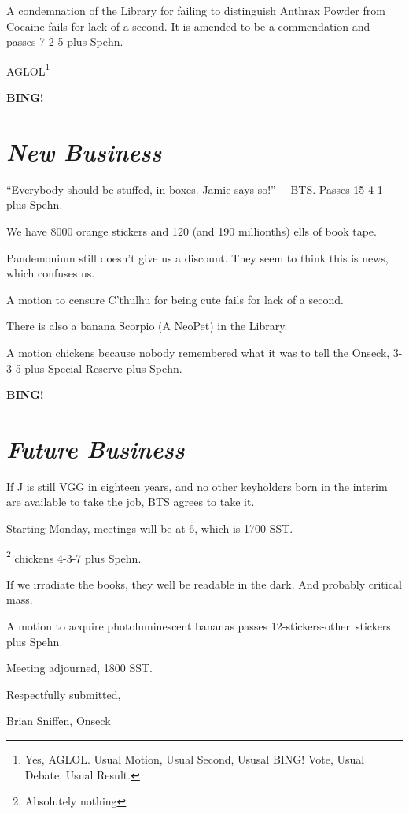 \documentclass[10pt]{article}
\newcommand{\bing}{{\bf BING!} }
\newcommand{\goto}[1]{\bing \vskip 12pt \section*{{\em{#1}}}}
\newcommand{\ps}{ plus Spehn\xspace}
\begin{document}
A condemnation of the Library for failing to distinguish Anthrax
Powder from Cocaine fails for lack of a second.  It is amended to be a
commendation and passes 7-2-5\ps.

AGLOL\footnote{Yes, AGLOL.  Usual Motion, Usual Second, Ususal BING! Vote,
  Usual Debate, Usual Result.}

\goto{New Business}

``Everybody should be stuffed, in boxes.  Jamie says so!'' ---BTS.
Passes 15-4-1\ps.

We have 8000 orange stickers and 120 (and 190 millionths) ells of book tape.

Pandemonium still doesn't give us a discount.  They seem to think this
is news, which confuses us.

A motion to censure C'thulhu for being cute fails for lack of a second.

There is also a banana Scorpio (A NeoPet) in the Library.

A motion chickens because nobody remembered what it was to tell the
Onseck, 3-3-5 plus Special Reserve \ps.

\goto{Future Business}

If J is still VGG in eighteen years, and no other keyholders born in
the interim are available to take the job, BTS agrees to take it.

Starting Monday, meetings will be at 6, which is 1700 SST.

\hspace{1in}\footnote{Absolutely nothing} chickens 4-3-7\ps.

If we irradiate the books, they well be readable in the dark.  And
probably critical mass.

A motion to acquire photoluminescent bananas passes
12-stickers-other~stickers\ps.

\vspace{12pt}

\noindent
Meeting adjourned, 1800 SST.

\vspace{18pt}

\centerline{Respectfully submitted,}
\centerline{Brian Sniffen, Onseck}
\end{document}
